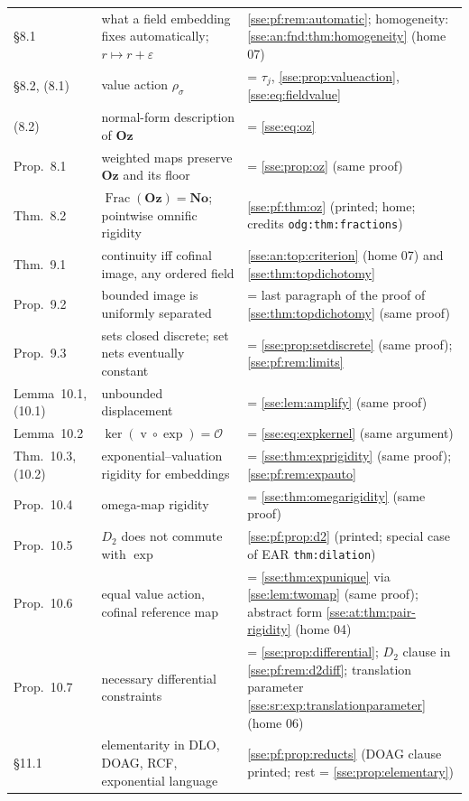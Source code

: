 \documentclass[11pt,a4paper]{article}
\numberwithin{equation}{section}
\theoremstyle{plain}
\theoremstyle{definition}
\theoremstyle{remark}
\newcommand{\No}{\mathbf{No}}
\newcommand{\Oz}{\mathbf{Oz}}
\newcommand{\val}{\operatorname{v}}
\newcommand{\lbl}[1]{\nolinkurl{#1}}%
\newcommand{\Fracpf}{\operatorname{Frac}}
\begin{document}
\begin{longtable}{P{27mm}P{50mm}P{71mm}}
\S8.1 & what a field embedding fixes automatically; $r\mapsto r+\varepsilon$ & \cref{sse:pf:rem:automatic}; homogeneity: \cref{sse:an:fnd:thm:homogeneity} (home 07) \\
\S8.2, (8.1) & value action $\rho_\sigma$ & = $\tau_j$, \cref{sse:prop:valueaction}, \eqref{sse:eq:fieldvalue} \\
(8.2) & normal-form description of $\Oz$ & = \eqref{sse:eq:oz} \\
Prop.~8.1 & weighted maps preserve $\Oz$ and its floor & = \cref{sse:prop:oz} (same proof) \\
Thm.~8.2 & $\Fracpf(\Oz)=\No$; pointwise omnific rigidity & \cref{sse:pf:thm:oz} (printed; home; credits \lbl{odg:thm:fractions}) \\
Thm.~9.1 & continuity iff cofinal image, any ordered field & \cref{sse:an:top:criterion} (home 07) and \cref{sse:thm:topdichotomy} \\
Prop.~9.2 & bounded image is uniformly separated & = last paragraph of the proof of \cref{sse:thm:topdichotomy} (same proof) \\
Prop.~9.3 & sets closed discrete; set nets eventually constant & = \cref{sse:prop:setdiscrete} (same proof); \cref{sse:pf:rem:limits} \\
Lemma~10.1, (10.1) & unbounded displacement & = \cref{sse:lem:amplify} (same proof) \\
Lemma~10.2 & $\ker(\val\circ\exp)=\mathcal O$ & = \eqref{sse:eq:expkernel} (same argument) \\
Thm.~10.3, (10.2) & exponential--valuation rigidity for embeddings & = \cref{sse:thm:exprigidity} (same proof); \cref{sse:pf:rem:expauto} \\
Prop.~10.4 & omega-map rigidity & = \cref{sse:thm:omegarigidity} (same proof) \\
Prop.~10.5 & $D_2$ does not commute with $\exp$ & \cref{sse:pf:prop:d2} (printed; special case of EAR \lbl{thm:dilation}) \\
Prop.~10.6 & equal value action, cofinal reference map & = \cref{sse:thm:expunique} via \cref{sse:lem:twomap} (same proof); abstract form \cref{sse:at:thm:pair-rigidity} (home 04) \\
Prop.~10.7 & necessary differential constraints & = \cref{sse:prop:differential}; $D_2$ clause in \cref{sse:pf:rem:d2diff}; translation parameter \cref{sse:sr:exp:translationparameter} (home 06) \\
\S11.1 & elementarity in DLO, DOAG, RCF, exponential language & \cref{sse:pf:prop:reducts} (DOAG clause printed; rest = \cref{sse:prop:elementary}) \\

\end{longtable}
\end{document}
